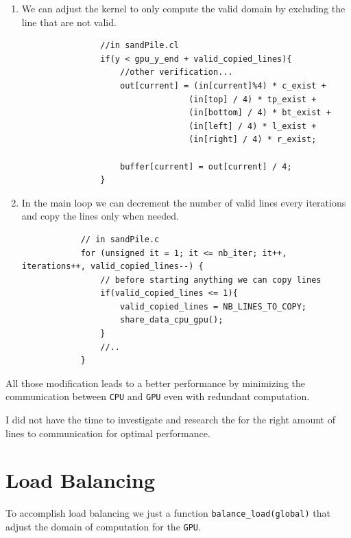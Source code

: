 \documentclass{report}
\def\CPU{\texttt{CPU}}
\def\GPU{\texttt{GPU}}
\newcommand{\code}[1]{\texttt{#1}}
\begin{document}
\begin{enumerate}
	\item We can adjust the kernel to only compute the valid domain by excluding the line that are not valid.
	      \begin{verbatim}
                //in sandPile.cl 
                if(y < gpu_y_end + valid_copied_lines){
                    //other verification...
                    out[current] = (in[current]%4) * c_exist +
                                  (in[top] / 4) * tp_exist + 
                                  (in[bottom] / 4) * bt_exist + 
                                  (in[left] / 4) * l_exist + 
                                  (in[right] / 4) * r_exist;

                    buffer[current] = out[current] / 4;
                }
              \end{verbatim}

	\item In the main loop we can decrement the number of valid lines every iterations and
	      copy the lines only when needed.

	      \begin{verbatim}
            // in sandPile.c 
            for (unsigned it = 1; it <= nb_iter; it++, iterations++, valid_copied_lines--) {
                // before starting anything we can copy lines
                if(valid_copied_lines <= 1){
                    valid_copied_lines = NB_LINES_TO_COPY;
                    share_data_cpu_gpu();
                }
                //..
            }
              \end{verbatim}

\end{enumerate}

All those modification leads to a better performance by minimizing the communication between
\CPU{} and \GPU{} even with redundant computation.

I did not have the time to investigate and research the for the right amount of lines to communication
for optimal performance.

\section{Load Balancing}
To accomplish load balancing we just a function \code{balance_load(global)} that adjust
the domain of computation for the \GPU{}.
\end{document}
